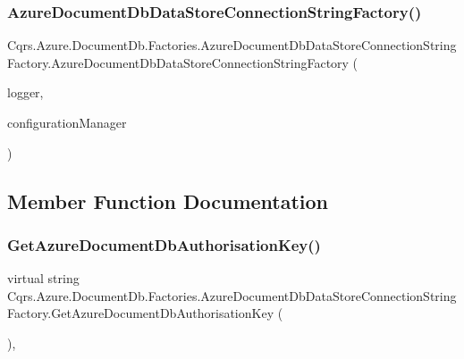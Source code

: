 \subsubsection{\texorpdfstring{Azure\+Document\+Db\+Data\+Store\+Connection\+String\+Factory()}{AzureDocumentDbDataStoreConnectionStringFactory()}}
{\footnotesize\ttfamily Cqrs.\+Azure.\+Document\+Db.\+Factories.\+Azure\+Document\+Db\+Data\+Store\+Connection\+String\+Factory.\+Azure\+Document\+Db\+Data\+Store\+Connection\+String\+Factory (\begin{DoxyParamCaption}\item[{I\+Logger}]{logger,  }\item[{\hyperlink{interfaceCqrs_1_1Configuration_1_1IConfigurationManager}{I\+Configuration\+Manager}}]{configuration\+Manager }\end{DoxyParamCaption})}



\subsection{Member Function Documentation}
\mbox{\label{classCqrs_1_1Azure_1_1DocumentDb_1_1Factories_1_1AzureDocumentDbDataStoreConnectionStringFactory_a794c6926a7b29f927d41a0160716972a}} 
\subsubsection{\texorpdfstring{Get\+Azure\+Document\+Db\+Authorisation\+Key()}{GetAzureDocumentDbAuthorisationKey()}}
{\footnotesize\ttfamily virtual string Cqrs.\+Azure.\+Document\+Db.\+Factories.\+Azure\+Document\+Db\+Data\+Store\+Connection\+String\+Factory.\+Get\+Azure\+Document\+Db\+Authorisation\+Key (\begin{DoxyParamCaption}{ }\end{DoxyParamCaption})\hspace{0.3cm}{\ttfamily [protected]}, {\ttfamily [virtual]}}

